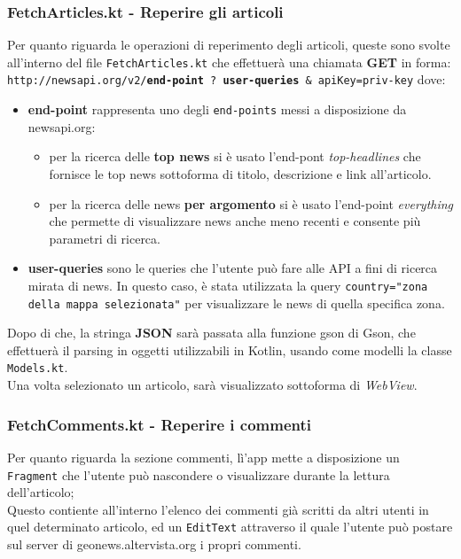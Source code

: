 \documentclass[12pt]{article}
\def\code#1{\texttt{#1}}
\begin{document}
\subsubsection{FetchArticles.kt - Reperire gli articoli}
Per quanto riguarda le operazioni di reperimento degli articoli, queste sono svolte all'interno del file \code{FetchArticles.kt} che effettuerà una chiamata \textbf{GET} in forma:\\ 
\code{http://newsapi.org/v2/\textbf{end-point} ? \textbf{user-queries} \& apiKey=priv-key} dove:
\begin{itemize}
\item\textbf{end-point} rappresenta uno degli \code{end-points} messi a disposizione da newsapi.org:
\begin{itemize}
\item per la ricerca delle \textbf{top news} si è usato l'end-pont \textit{top-headlines} che fornisce le top news sottoforma di titolo, descrizione e link all'articolo.
\item per la ricerca delle news \textbf{per argomento} si è usato l'end-point \textit{everything} che permette di visualizzare news anche meno recenti e consente più parametri di ricerca.
\end{itemize}
\item\textbf{user-queries} sono le queries che l'utente può fare alle API a fini di ricerca mirata di news. In questo caso, è stata utilizzata la query \code{country="zona della mappa selezionata"} per visualizzare le news di quella specifica zona.
\end{itemize}
Dopo di che, la stringa \textbf{JSON} sarà passata alla funzione gson di Gson, che effettuerà il parsing in oggetti utilizzabili in Kotlin, usando come modelli la classe \code{Models.kt}.\\
Una volta selezionato un articolo, sarà visualizzato sottoforma di \textit{WebView}.
\subsubsection{FetchComments.kt - Reperire i commenti}
Per quanto riguarda la sezione commenti, lì'app mette a disposizione un \code{Fragment} che l'utente può nascondere o visualizzare durante la lettura dell'articolo;\\
Questo contiente all'interno l'elenco dei commenti già scritti da altri utenti in quel determinato articolo, ed un \code{EditText} attraverso il quale l'utente può postare sul server di geonews.altervista.org i propri commenti.
\end{document}
